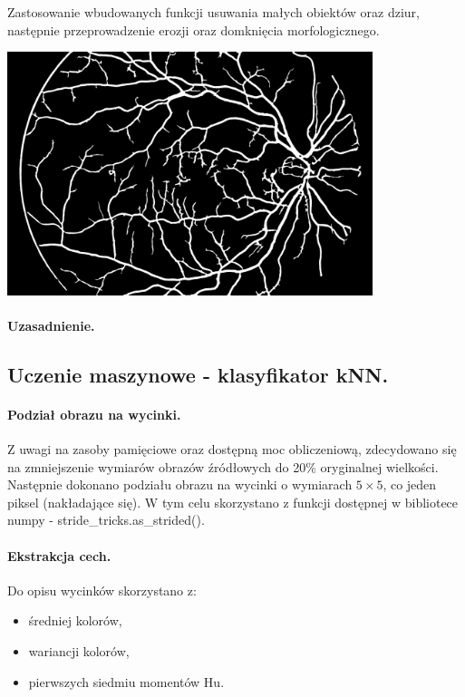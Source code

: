 \documentclass[a4paper, 11pt]{article}
\begin{document}
Zastosowanie wbudowanych funkcji usuwania małych obiektów oraz dziur, następnie przeprowadzenie erozji oraz domknięcia morfologicznego.
\begin{center}
	\includegraphics[width=0.8\textwidth]{./processing/deblobed_image.png}
\end{center}
\paragraph{Uzasadnienie.}


\subsection{Uczenie maszynowe - klasyfikator kNN.}
\paragraph{Podział obrazu na wycinki.}


Z uwagi na zasoby pamięciowe oraz dostępną moc obliczeniową, zdecydowano się na zmniejszenie wymiarów obrazów źródłowych do 20\% oryginalnej wielkości. Następnie dokonano podziału obrazu na wycinki o wymiarach $5\times5$, co jeden piksel (nakładające się). W tym celu skorzystano z funkcji dostępnej w bibliotece numpy - stride\_tricks.as\_strided().
\paragraph{Ekstrakcja cech.}

Do opisu wycinków skorzystano z:
\begin{itemize}
	\item średniej kolorów,
	\item wariancji kolorów,
	\item pierwszych siedmiu momentów Hu.
\end{itemize}
\end{document}
